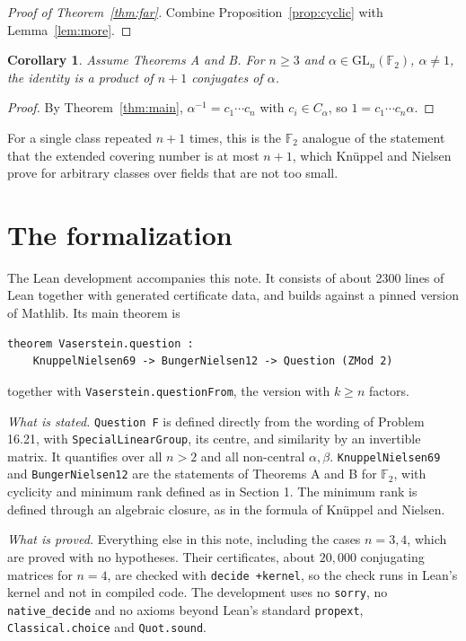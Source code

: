 \documentclass[11pt]{amsart}
\newtheorem{corollary}[theorem]{Corollary}
\theoremstyle{definition}
\theoremstyle{remark}
\newcommand{\F}{\mathbb{F}_2}
\newcommand{\GL}{\mathrm{GL}}
\begin{document}
\begin{proof}[Proof of Theorem~\ref{thm:far}]
Combine Proposition~\ref{prop:cyclic} with Lemma~\ref{lem:more}.
\end{proof}

\begin{corollary}
Assume Theorems A and B. For $n\ge3$ and $\alpha\in\GL_n(\F)$, $\alpha\ne1$, the identity is a
product of $n+1$ conjugates of $\alpha$.
\end{corollary}

\begin{proof}
By Theorem~\ref{thm:main}, $\alpha^{-1}=c_1\cdots c_n$ with $c_i\in C_\alpha$, so
$1=c_1\cdots c_n\alpha$.
\end{proof}

For a single class repeated $n+1$ times, this is the $\F$ analogue of the statement that the
extended covering number is at most $n+1$, which Kn\"uppel and Nielsen prove for arbitrary
classes over fields that are not too small.

\section{The formalization}\label{sec:lean}

The Lean development accompanies this note. It consists of about 2300 lines of Lean together
with generated certificate data, and builds against a pinned version of Mathlib. Its main
theorem is
\begin{verbatim}
theorem Vaserstein.question :
    KnuppelNielsen69 -> BungerNielsen12 -> Question (ZMod 2)
\end{verbatim}
together with \texttt{Vaserstein.questionFrom}, the version with $k\ge n$ factors.

\emph{What is stated.} \texttt{Question F} is defined directly from the wording of Problem
16.21, with \texttt{SpecialLinearGroup}, its centre, and similarity by an invertible matrix. It
quantifies over all $n>2$ and all non-central $\alpha,\beta$. \texttt{KnuppelNielsen69} and
\texttt{BungerNielsen12} are the statements of Theorems A and B for $\F$, with cyclicity and
minimum rank defined as in Section 1. The minimum rank is defined through an algebraic closure,
as in the formula of Kn\"uppel and Nielsen.

\emph{What is proved.} Everything else in this note, including the cases $n=3,4$, which are
proved with no hypotheses. Their certificates, about $20{,}000$ conjugating matrices for $n=4$,
are checked with \texttt{decide +kernel}, so the check runs in Lean's kernel and not in compiled
code. The development uses no \texttt{sorry}, no \texttt{native\_decide} and no axioms beyond
Lean's standard \texttt{propext}, \texttt{Classical.choice} and \texttt{Quot.sound}.
\end{document}
